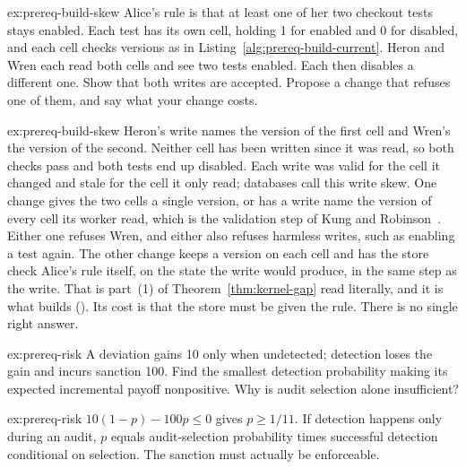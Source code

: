 \begin{pdexercise}[kind=Open,rating=3]{ex:prereq-build-skew}
Alice's rule is that at least one of her two checkout tests stays enabled.
Each test has its own cell, holding 1 for enabled and 0 for disabled, and
each cell checks versions as in Listing~\ref{alg:prereq-build-current}. Heron
and Wren each read both cells and see two tests enabled. Each then disables
a different one. Show that both writes are accepted. Propose a change that
refuses one of them, and say what your change costs.
\end{pdexercise}
\begin{pdsolution}{ex:prereq-build-skew}
Heron's write names the version of the first cell and Wren's the version of
the second. Neither cell has been written since it was read, so both checks
pass and both tests end up disabled. Each write was valid for the cell it
changed and stale for the cell it only read; databases call this write skew.
One change gives the two cells a single version, or has a write name the
version of every cell its worker read, which is the validation step of Kung
and Robinson~. Either one refuses Wren, and either
also refuses harmless writes, such as enabling a test again. The other
change keeps a version on each cell and has the store check Alice's rule
itself, on the state the write would produce, in the same step as the
write. That is part~(1) of Theorem~\ref{thm:kernel-gap} read literally, and
it is what  builds
(). Its cost is that the store must be given
the rule. There is no single right answer.
\end{pdsolution}

\begin{pdexercise}[kind=Check,rating=1]{ex:prereq-risk}
A deviation gains 10 only when undetected; detection loses the gain and incurs
sanction 100. Find the smallest detection probability making its expected
incremental payoff nonpositive. Why is audit selection alone insufficient?
\end{pdexercise}
\begin{pdsolution}{ex:prereq-risk}
$10(1-p)-100p\le0$ gives $p\ge1/11$. If detection happens only during an audit, $p$ equals audit-selection
probability times successful detection conditional on selection. The sanction
must actually be enforceable.
\end{pdsolution}

